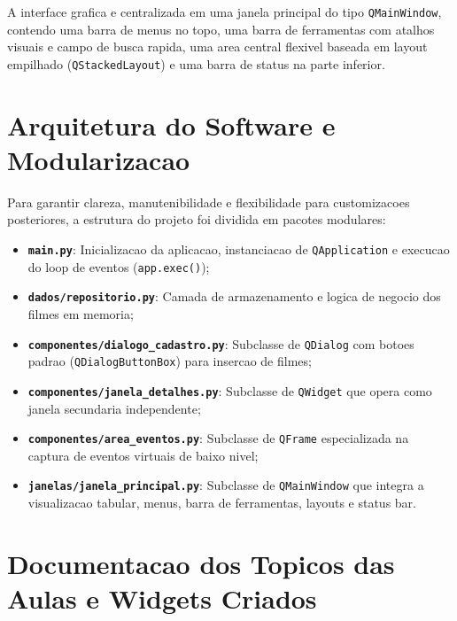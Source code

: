 ﻿\documentclass[12pt]{article}
\begin{document}
A interface grafica e centralizada em uma janela principal do tipo \texttt{QMainWindow}, contendo uma barra de menus no topo, uma barra de ferramentas com atalhos visuais e campo de busca rapida, uma area central flexivel baseada em layout empilhado (\texttt{QStackedLayout}) e uma barra de status na parte inferior.
\section{Arquitetura do Software e Modularizacao}

Para garantir clareza, manutenibilidade e flexibilidade para customizacoes posteriores, a estrutura do projeto foi dividida em pacotes modulares:

\begin{itemize}
    \item \textbf{\texttt{main.py}}: Inicializacao da aplicacao, instanciacao de \texttt{QApplication} e execucao do loop de eventos (\texttt{app.exec()});
    \item \textbf{\texttt{dados/repositorio.py}}: Camada de armazenamento e logica de negocio dos filmes em memoria;
    \item \textbf{\texttt{componentes/dialogo\_cadastro.py}}: Subclasse de \texttt{QDialog} com botoes padrao (\texttt{QDialogButtonBox}) para insercao de filmes;
    \item \textbf{\texttt{componentes/janela\_detalhes.py}}: Subclasse de \texttt{QWidget} que opera como janela secundaria independente;
    \item \textbf{\texttt{componentes/area\_eventos.py}}: Subclasse de \texttt{QFrame} especializada na captura de eventos virtuais de baixo nivel;
    \item \textbf{\texttt{janelas/janela\_principal.py}}: Subclasse de \texttt{QMainWindow} que integra a visualizacao tabular, menus, barra de ferramentas, layouts e status bar.
\end{itemize}

\section{Documentacao dos Topicos das Aulas e Widgets Criados}
\end{document}
